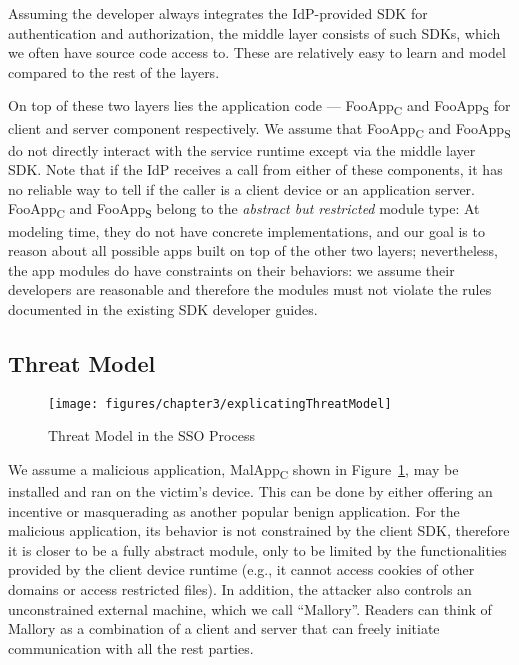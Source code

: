 Assuming the developer always integrates the IdP-provided SDK for authentication and authorization, the middle layer consists of such SDKs, which we often have source code access to.  These are relatively easy to learn and model compared to the rest of the layers.

On top of these two layers lies the application code --- FooApp\textsubscript{C} and FooApp\textsubscript{S} for client and server component respectively.  We assume that FooApp\textsubscript{C} and FooApp\textsubscript{S} do not directly interact with the service runtime except via the middle layer SDK.  Note that if the IdP receives a call from either of these components, it has no reliable way to tell if the caller is a client device or an application server.  FooApp\textsubscript{C} and FooApp\textsubscript{S} belong to the \emph{abstract but restricted} module type:  At modeling time, they do not have concrete implementations, and our goal is to reason about all possible apps built on top of the other two layers; nevertheless, the app modules do have constraints on their behaviors: we assume their developers are reasonable and therefore the modules must not violate the rules documented in the existing SDK developer guides.

\subsection{Threat Model}

\begin{figure}[hbt]
\centering
\texttt{[image: figures/chapter3/explicatingThreatModel]}
\caption{Threat Model in the SSO Process}
\label{fig:explicatingThreatModel}
\end{figure}

We assume a malicious application, MalApp\textsubscript{C} shown in Figure~\ref{fig:explicatingThreatModel}, may be installed and ran on the victim's device.  This can be done by either offering an incentive or masquerading as another popular benign application.  For the malicious application, its behavior is not constrained by the client SDK, therefore it is closer to be a fully abstract module, only to be limited by the functionalities provided by the client device runtime (e.g., it cannot access cookies of other domains or access restricted files).  In addition, the attacker also controls an unconstrained external machine, which we call ``Mallory''. Readers can think of Mallory as a combination of a client and server that can freely initiate communication with all the rest parties. 

